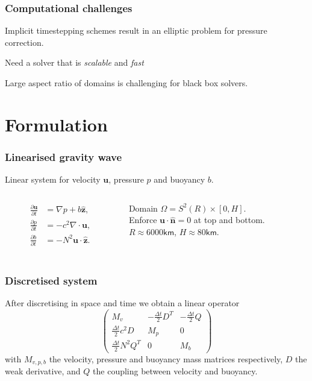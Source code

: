 \documentclass[presentation]{beamer}
\renewcommand{\vec}[1]{\ensuremath{\boldsymbol{#1}}}
\newcommand{\ddt}[1]{\frac{\partial #1}{\partial t}}
\newcommand{\zhat}{\hat{\vec{z}}}
\begin{document}
\begin{frame}
  \frametitle{Computational challenges}
  Implicit timestepping schemes result in an elliptic problem for
  pressure correction.

  Need a solver that is \emph{scalable} and \emph{fast}

  Large aspect ratio of domains is challenging for black box solvers.
\end{frame}

\section{Formulation}

\begin{frame}
  \frametitle{Linearised gravity wave}
  Linear system for velocity $\vec{u}$, pressure $p$ and buoyancy $b$.
  \begin{columns}
    \begin{column}{0.4\textwidth}
      \begin{align*}
        \label{eq:1}
        \ddt{\vec{u}} &= \nabla p + b \zhat, \\
        \ddt{p} &= -c^2 \nabla\cdot \vec{u}, \\
        \ddt{b} &= -N^2\vec{u}\cdot\zhat.\\
      \end{align*}
    \end{column}
    \begin{column}{0.6\textwidth}
      Domain $\Omega = S^2(R) \times [0, H]$.\\
      Enforce $\vec{u}\cdot \hat{\vec{n}} = 0$ at top and bottom.\\
      $R\approx 6000\textsf{km}$, $H\approx 80\textsf{km}$.
    \end{column}
  \end{columns}
\end{frame}

\begin{frame}
  \frametitle{Discretised system}
  After discretising in space and time we obtain a linear operator
\begin{equation*}
\begin{pmatrix}
  M_v & 
    -\frac{\Delta t}{2}D^T & 
    -\frac{\Delta t}{2}Q\\[1ex]
  \frac{\Delta t}{2}c^2D & M_p & 0\\[1ex]
  \frac{\Delta t}{2}N^2Q^T & 0 & M_b
\end{pmatrix}
\end{equation*}
with $M_{v,p,b}$ the velocity, pressure and buoyancy mass matrices
respectively, $D$ the weak derivative, and $Q$ the coupling between
velocity and buoyancy.
\end{frame}
\end{document}
